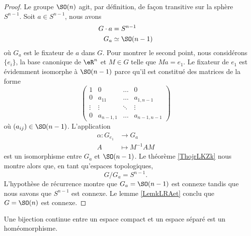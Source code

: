 \begin{proof}
    Le groupe \( \SO(n)\) agit, par définition, de façon transitive sur la sphère \( S^{n-1}\). Soit \( a\in S^{n-1}\), nous avons
    \begin{subequations}
        \begin{align}
            G\cdot a&=S^{n-1}\\
            G_a&\simeq \SO(n-1)
        \end{align}
    \end{subequations}
    où \( G_a\) est le fixateur de \( a\) dans \( G\). Pour montrer le second point, nous considérons \( \{ e_i \}\), la base canonique de \( \eR^n\) et \( M\in G\) telle que \( Ma=e_1\). Le fixateur de \( e_1\) est évidemment isomorphe à \( \SO(n-1)\) parce qu'il est constitué des matrices de la forme
    \begin{equation}
        \begin{pmatrix}
             1   &   0    &   \ldots    &   0    \\
             0   &   a_{11}    &   \ldots    &   a_{1,n-1}    \\
             \vdots   &   \vdots    &   \ddots    &   \vdots    \\ 
             0   &   a_{n-1,1}    &   \ldots    &   a_{n-1,n-1}     
         \end{pmatrix}
    \end{equation}
    où \( (a_{ij})\in \SO(n-1)\). L'application 
    \begin{equation}
        \begin{aligned}
            \alpha\colon G_{e_1} &\to G_{a} \\
            A&\mapsto M^{-1}A M
        \end{aligned}
    \end{equation}
    est un isomorphisme entre \( G_a\) et \( \SO(n-1)\). Le théorème \ref{ThojrLKZk} nous montre alors que, en tant qu'espaces topologiques,
    \begin{equation}
        G/G_a=S^{n-1}.
    \end{equation}
    L'hypothèse de récurrence montre que \( G_a=\SO(n-1)\) est connexe tandis que nous savons que \( S^{n-1}\) est connexe. Le lemme \ref{LemkLRAet} conclu que \( G=\SO(n)\) est connexe.
\end{proof}

\begin{lemma}       \label{LemIbrsFT}
    Une bijection continue entre un espace compact et un espace séparé est un homéomorphisme.
\end{lemma}

